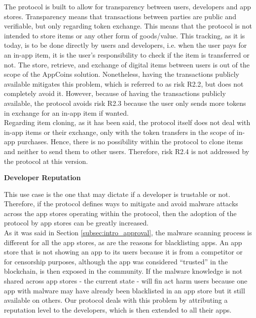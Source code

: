 The protocol is built to allow for transparency between users, developers and app stores. Transparency means that transactions between parties are public and verifiable, but only regarding token exchange. This means that the protocol is not intended to store items or any other form of goods/value. This tracking, as it is today, is to be done directly by users and developers, i.e. when the user pays for an in-app item, it is the user's responsibility to check if the item is transferred or not. The store, retrieve, and exchange of digital items between users is out of the scope of the AppCoins solution. Nonetheless, having the transactions publicly available mitigates this problem, which is referred to as risk \textsf{R2.2}, but does not completely avoid it. However, because of having the transactions publicly available, the protocol avoids risk \textsf{R2.3} because the user only sends more tokens in exchange for an in-app item if wanted. \\

Regarding item cloning, as it has been said, the protocol itself does not deal with in-app items or their exchange, only with the token transfers in the scope of in-app purchases. Hence, there is no possibility within the protocol to clone items and neither to send them to other users. Therefore, risk \textsf{R2.4} is not addressed by the protocol at this version. \\

\medskip

{\bf Developer Reputation}

This use case is the one that may dictate if a developer is trustable or not. Therefore, if the protocol defines ways to mitigate and avoid malware attacks across the app stores operating within the protocol, then the adoption of the protocol by app stores can be greatly increased. \\

As it was said in Section \ref{subsec:intro_approval}, the malware scanning process is different for all the app stores, as are the reasons for blacklisting apps. An app store that is not showing an app to its users because it is from a competitor or for censorship purposes, although the app was considered ``trusted'' in the blockchain, is then exposed in the community. If the malware knowledge is not shared across app stores - the current state - will fin act harm users because one app with malware may have already been blacklisted in an app store but it still available on others. Our protocol deals with this problem by attributing a reputation level to the developers, which is then extended to all their apps. \\


